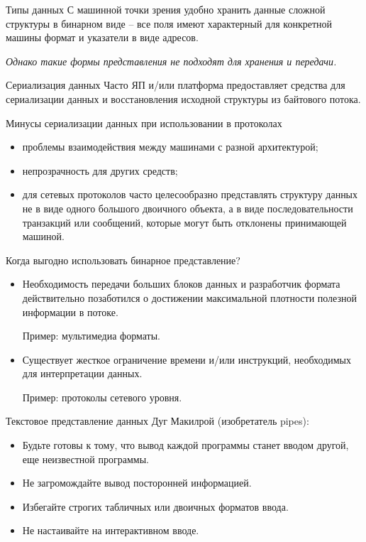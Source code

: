 \begin{frame}{Типы данных}
	С машинной точки зрения удобно хранить данные сложной структуры в бинарном виде -- все поля имеют характерный для конкретной машины формат и указатели в виде адресов.

	\pause
	{\itshape Однако такие формы представления не подходят для хранения и передачи.}
\end{frame}

\begin{frame}{Сериализация данных}
	Часто ЯП и/или платформа предоставляет средства для сериализации данных и восстановления исходной структуры из байтового потока.
\end{frame}

\begin{frame}{Минусы сериализации данных при использовании в протоколах}
	\begin{itemize}
		\item проблемы взаимодействия между машинами с разной архитектурой;
			\pause
		\item непрозрачность для других средств;
			\pause
		\item для сетевых протоколов часто целесообразно представлять структуру данных не в виде одного большого двоичного объекта,  а в виде последовательности транзакций или сообщений,  которые могут быть отклонены принимающей машиной.
	\end{itemize}
\end{frame}


\begin{frame}{Когда выгодно использовать бинарное представление?}
	\begin{itemize}
		\item Необходимость передачи больших блоков данных и разработчик формата действительно позаботился о достижении максимальной плотности полезной информации в потоке.

			Пример: мультимедиа форматы.
			\pause
		\item Существует жесткое ограничение времени и/или инструкций,  необходимых для интерпретации данных.

			Пример: протоколы сетевого уровня.
	\end{itemize}
\end{frame}

\begin{frame}{Текстовое представление данных}
	Дуг Макилрой (изобретатель pipes):
	\begin{itemize}
		\item Будьте готовы к тому,  что вывод каждой программы станет вводом другой,  еще неизвестной программы. 
			\pause
		\item Не загромождайте вывод посторонней информацией. 
			\pause
		\item Избегайте строгих табличных или двоичных форматов ввода. 
			\pause
		\item Не настаивайте на интерактивном вводе.
	\end{itemize}
\end{frame}

